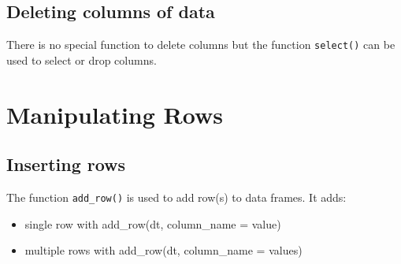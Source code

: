 \documentclass[
]{book}
\providecommand{\tightlist}{%
  \setlength{\itemsep}{0pt}\setlength{\parskip}{0pt}}
\begin{document}
\hypertarget{deleting-columns-of-data}{%
\subsection{Deleting columns of data}\label{deleting-columns-of-data}}

There is no special function to delete columns but the function \texttt{select()} can be used to select or drop columns.

\hypertarget{manipulating-rows-1}{%
\section{Manipulating Rows}\label{manipulating-rows-1}}

\hypertarget{inserting-rows}{%
\subsection{Inserting rows}\label{inserting-rows}}

The function \texttt{add\_row()} is used to add row(s) to data frames. It adds:

\begin{itemize}
\tightlist
\item
  single row with add\_row(dt, column\_name = value)
\item
  multiple rows with add\_row(dt, column\_name = values)
\end{itemize}
\end{document}
